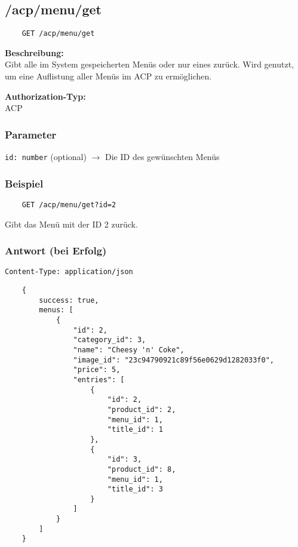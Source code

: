\subsection{/acp/menu/get}

\begin{lstlisting}
    GET /acp/menu/get
\end{lstlisting}

\textbf{Beschreibung:} \\
Gibt alle im System gespeicherten Menüs oder nur eines zurück. Wird genutzt, um eine Auflistung aller Menüs im ACP zu ermöglichen.

\textbf{Authorization-Typ:} \\
ACP

\subsubsection{Parameter}

\lstinline{id: number} (optional)
$\rightarrow$ Die ID des gewünschten Menüs

\subsubsection{Beispiel}

\begin{lstlisting}
    GET /acp/menu/get?id=2
\end{lstlisting}

Gibt das Menü mit der ID 2 zurück.

\subsubsection{Antwort (bei Erfolg)}

\lstinline{Content-Type: application/json}
\begin{lstlisting}
    {
        success: true, 
        menus: [
            {
                "id": 2,
                "category_id": 3,
                "name": "Cheesy 'n' Coke",
                "image_id": "23c94790921c89f56e0629d1282033f0",
                "price": 5,
                "entries": [
                    {
                        "id": 2,
                        "product_id": 2,
                        "menu_id": 1,
                        "title_id": 1
                    },
                    {
                        "id": 3,
                        "product_id": 8,
                        "menu_id": 1,
                        "title_id": 3
                    }
                ]
            }
        ]
    }
\end{lstlisting}
